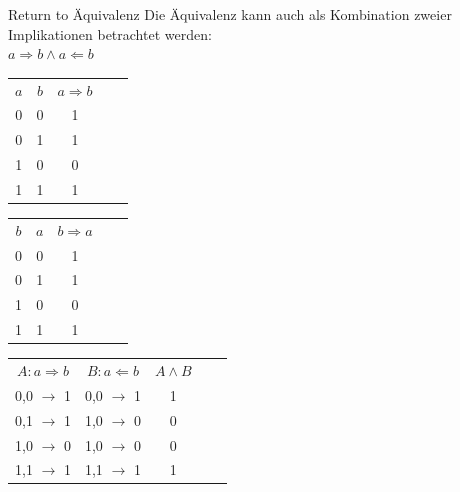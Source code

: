 \documentclass[12pt%
,aspectratio=169%
]{beamer}
\begin{document}
\begin{frame}{Return to Äquivalenz}
Die Äquivalenz kann auch als Kombination zweier Implikationen betrachtet werden:\\
$a \Rightarrow b \land a \Leftarrow b$
\begin{center}
\begin{table}[]
\begin{tabular}{|c|c|c|ll}
\cline{1-3}
$a$ & $b$ & $a \Rightarrow b$ &  &  \\ \cline{1-3}
0 & 0 & 1 &  &  \\ \cline{1-3}
0 & 1 & 1 &  &  \\ \cline{1-3}
1 & 0 & 0 &  &  \\ \cline{1-3}
1 & 1 & 1 &  &  \\ \cline{1-3}
\end{tabular}
%
\begin{tabular}{|c|c|c|ll}
\cline{1-3}
$b$ & $a$ & $b \Rightarrow a$ &  &  \\ \cline{1-3}
0 & 0 & 1 &  &  \\ \cline{1-3}
0 & 1 & 1 &  &  \\ \cline{1-3}
1 & 0 & 0 &  &  \\ \cline{1-3}
1 & 1 & 1 &  &  \\ \cline{1-3}
\end{tabular}
%
\begin{tabular}{|c|c|c|ll}
\cline{1-3}
$A: a \Rightarrow b$ & $B: a \Leftarrow b$ & $A \land B$ &  &  \\ \cline{1-3}
0,0 $\to$ 1 & 0,0 $\to$ 1 & 1 &  &  \\ \cline{1-3}
0,1 $\to$ 1 & 1,0 $\to$ 0 & 0 &  &  \\ \cline{1-3}
1,0 $\to$ 0 & 1,0 $\to$ 0 & 0 &  &  \\ \cline{1-3}
1,1 $\to$ 1 & 1,1 $\to$ 1 & 1 &  &  \\ \cline{1-3}
\end{tabular}
\end{table}

\end{center}

\end{frame}
\end{document}
